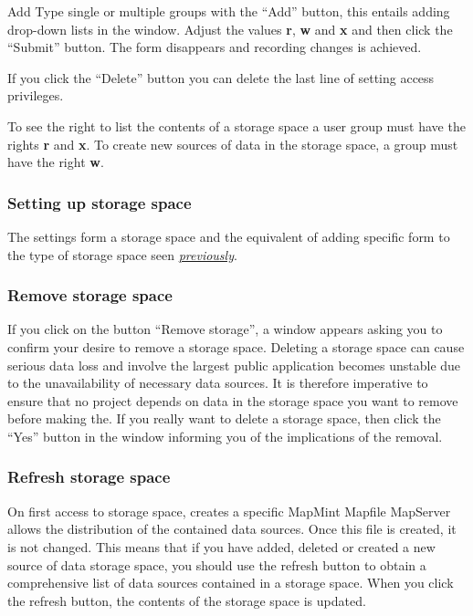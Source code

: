 \documentclass[letterpaper,10pt,english]{sphinxmanual}
\begin{document}
Add Type single or multiple groups with the ``Add'' button, this entails adding drop-down lists in the window. Adjust the values  \textbf{r}, \textbf{w}  and  \textbf{x} and then click the ``Submit'' button. The form disappears and recording changes is achieved.

If you click the ``Delete'' button you can delete the last line of setting access privileges.

To see the right to list the contents of a storage space a user group must have the rights \textbf{r} and \textbf{x}. To create new sources of data in the storage space, a group must have the right \textbf{w}.


\subsubsection{Setting up storage space}
\label{data/datastores:parametrage-d-un-espace-de-stockage}
The settings form a storage space and the equivalent of adding specific form to the type of storage space seen {\hyperref[data/datastores:datadatastores-add]{\emph{previously}}}.


\subsubsection{Remove storage space}
\label{data/datastores:supprimer-un-espace-de-stockage}
If you click on the button ``Remove storage'', a window appears asking you to confirm your desire to remove a storage space. Deleting a storage space can cause serious data loss and involve the largest public application becomes unstable due to the unavailability of necessary data sources. It is therefore imperative to ensure that no project depends on data in the storage space you want to remove before making the. If you really want to delete a storage space, then click the ``Yes'' button in the window informing you of the implications of the removal.


\subsubsection{Refresh storage space}
\label{data/datastores:rafraichir-un-espace-de-stockage}
On first access to storage space, creates a specific MapMint Mapfile MapServer allows the distribution of the contained data sources. Once this file is created, it is not changed. This means that if you have added, deleted or created a new source of data storage space, you should use the refresh button to obtain a comprehensive list of data sources contained in a storage space. When you click the refresh button, the contents of the storage space is updated.
\end{document}
